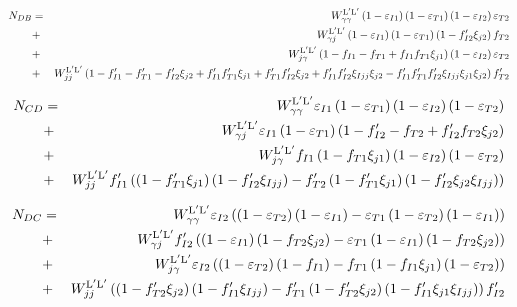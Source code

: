   \begin{eqnarray}
    N_{DB} &=& \WyyLL \left(1-\eIone\right) \left(1-\eTone \right)\left(1-\eItwo  \right)\eTtwo \nonumber \\
    &+& \WyjLL\left(1-\eIone\right)\left(1-\eTone \right)\left(1-\fIptwo\xijtwo\right)\fTtwo  \nonumber \\
    &+& \WjyLL\left(1-\fIone-\fTone+\fIone\fTone \xijone \right) \left(1-\eItwo  \right)\eTtwo  \\
    &+& \WjjLL\left(1-\fIpone -\fTpone -\fIptwo \xijtwo+\fIpone\fTpone \xijone+\fTpone\fIptwo \xijtwo+\fIpone\fIptwo \xiIjj\xijtwo-\fIpone\fTpone\fIptwo \xiIjj\xijone\xijtwo\right)\fTptwo \nonumber
  \end{eqnarray}
  
  \begin{eqnarray}
    N_{CD} &=& \WyyLL \eIone\left(1-\eTone\right) \left(1-\eItwo \right)\left(1-\eTtwo \right) \nonumber \\
    &+& \WyjLL\eIone \left(1-\eTone  \right) \left(1-\fIptwo -\fTtwo +\fIptwo\fTtwo\xijtwo\right) \nonumber \\
    &+& \WjyLL\fIone \left(1-\fTone \xijone\right)\left(1-\eItwo  \right)\left(1 -\eTtwo\right)  \\
    &+& \WjjLL\fIpone \left(\left(1-\fTpone\xijone\right) \left(1-\fIptwo \xiIjj\right)-\fTptwo \left(1-\fTpone  \xijone\right) \left(1-\fIptwo\xijtwo \xiIjj\right)\right) \nonumber
  \end{eqnarray}
  
  \begin{eqnarray}
    N_{DC} &=& \WyyLL \eItwo \left(\left(1-\eTtwo  \right) \left(1-\eIone  \right)-\eTone \left(1-\eTtwo   \right) \left(1-\eIone   \right)\right) \nonumber \\
    &+& \WyjLL\fIptwo \left(\left(1-\eIone  \right) \left(1-\fTtwo \xijtwo\right)-\eTone \left(1-\eIone   \right) \left(1-\fTtwo\xijtwo  \right)\right) \nonumber \\
    &+& \WjyLL\eItwo \left(\left(1-\eTtwo  \right) \left(1-\fIone  \right)-\fTone \left(1-\fIone \xijone\right) \left(1-\eTtwo   \right)\right)  \\
    &+& \WjjLL\left(\left(1-\fTptwo \xijtwo\right) \left(1-\fIpone\xiIjj\right)-\fTpone \left(1-\fTptwo  \xijtwo\right) \left(1-\fIpone \xijone \xiIjj\right)\right)\fIptwo \nonumber
  \end{eqnarray}
  
